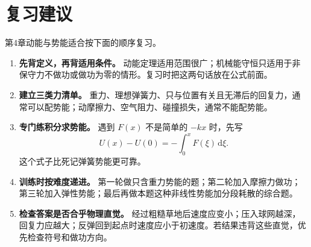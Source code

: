 \documentclass[11pt,a4paper,fontset=fandol]{ctexart}
\newcommand{\dd}{\mathrm{d}}
\begin{document}
\section*{复习建议}
\begin{tipBox}
第4章动能与势能适合按下面的顺序复习。
\begin{enumerate}
 \item \textbf{先背定义，再背适用条件。} 动能定理适用范围很广；机械能守恒只适用于非保守力不做功或做功为零的情形。复习时把这两句话放在公式前面。
 \item \textbf{建立三类力清单。} 重力、理想弹簧力、只与位置有关且无滞后的回复力，通常可以配势能；动摩擦力、空气阻力、碰撞损失，通常不能配势能。

 \item \textbf{专门练积分求势能。} 遇到 $F(x)$ 不是简单的 $-kx$ 时，先写
 \[
 U(x)-U(0)=-\int_0^x F(\xi)\,\dd\xi.
 \]
 这个式子比死记弹簧势能更可靠。
 \item \textbf{训练时按难度递进。} 第一轮做只含重力势能的题；第二轮加入摩擦力做功；第三轮加入弹性势能；最后再做本题这种非线性势能加分段耗散的综合题。
 \item \textbf{检查答案是否合乎物理直觉。} 经过粗糙草地后速度应变小；压入球网越深，回复力应越大；反弹回到起点时速度应小于初速度。若结果违背这些直觉，优先检查符号和做功方向。
\end{enumerate}
\end{tipBox}
\end{document}
